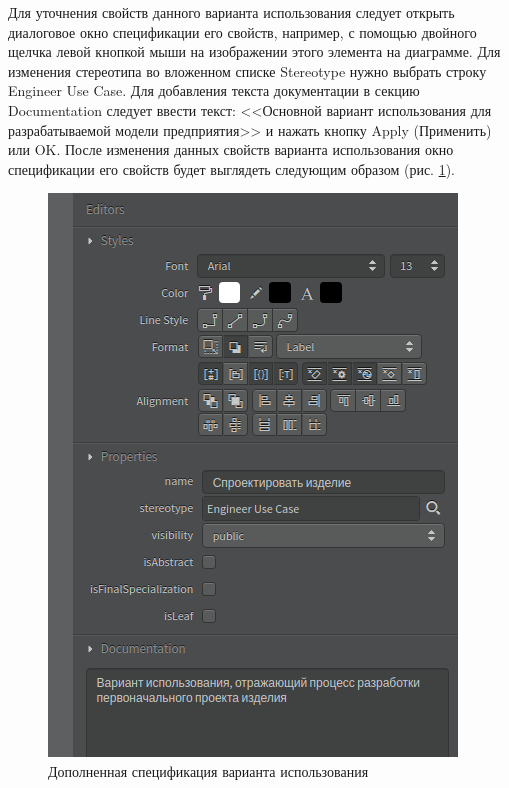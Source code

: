 \documentclass[a4paper,12pt]{extreport}
\begin{document}
Для уточнения свойств данного варианта использования следует открыть диалоговое окно спецификации его свойств, например, с помощью двойного щелчка левой кнопкой мыши на изображении этого элемента на диаграмме. Для изменения стереотипа во вложенном списке Stereotype нужно выбрать строку Engineer Use Case. Для добавления текста документации в секцию Documentation следует ввести текст: <<Основной вариант использования для разрабатываемой модели предприятия>> и нажать кнопку Apply (Применить) или OK. После изменения данных свойств варианта использования окно спецификации его свойств будет выглядеть следующим образом (рис. \ref{fig:actioneditors}).


\begin{figure}[h!]
	\centering
	\includegraphics[width=0.4\linewidth]{images/actioneditors}
	\caption{Дополненная спецификация варианта использования}
	\label{fig:actioneditors}
\end{figure}
\end{document}
